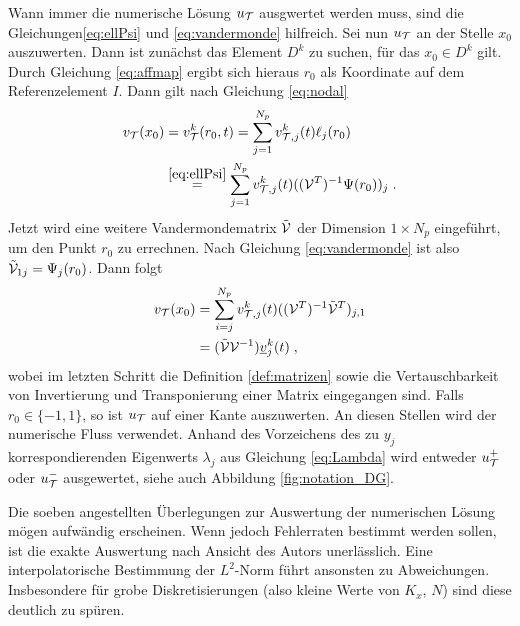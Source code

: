 Wann immer die numerische Lösung $u_{\mathcal{T}}$ ausgwertet werden muss, sind die Gleichungen\eqref{eq:ellPsi} und \eqref{eq:vandermonde} hilfreich. Sei nun $u_{\mathcal{T}}$ an der Stelle $x_0$ auszuwerten. Dann ist zunächst das Element $D^k$ zu suchen, für das $x_0\in D^k$ gilt. Durch Gleichung \eqref{eq:affmap} ergibt sich hieraus $r_0$ als Koordinate auf dem Referenzelement $I$. Dann gilt nach Gleichung \eqref{eq:nodal}
\begin{align*}
  v_{\mathcal{T}}(x_0) &= v_{\mathcal{T}}^k(r_0,t) = \sum_{j=1}^{N_p} v_{\mathcal{T},j}^k(t)\ell_j(r_0) \\
   &\stackrel{\eqref{eq:ellPsi}}{=} \sum_{j=1}^{N_p} v_{\mathcal{T},j}^k(t) ((\mathcal{V}^T)^{-1}\Psi(r_0))_j \; .
\end{align*}
Jetzt wird eine weitere Vandermondematrix $\tilde{\mathcal{V}}$ der Dimension $1\times N_p$ eingeführt, um den Punkt $r_0$ zu errechnen. Nach Gleichung \eqref{eq:vandermonde} ist also $\tilde{\mathcal{V}}_{1j}=\Psi_j(r_0)$. Dann folgt
\begin{align*}
  v_{\mathcal{T}}(x_0) &= \sum_{i=j}^{N_p} v_{\mathcal{T},j}^k(t) ((\mathcal{V}^T)^{-1}\tilde{\mathcal{V}}^T)_{j,1} \\
  &= (\tilde{\mathcal{V}}\mathcal{V}^{-1})\underline{v}_j^k(t) \; ,
\end{align*}
wobei im letzten Schritt die Definition \ref{def:matrizen} sowie die Vertauschbarkeit von Invertierung und Transponierung einer Matrix eingegangen sind. Falls $r_0\in\{-1,1\}$, so ist $u_{\mathcal{T}}$ auf einer Kante auszuwerten. An diesen Stellen wird der numerische Fluss verwendet. Anhand des Vorzeichens des zu $y_j$ korrespondierenden Eigenwerts $\lambda_j$ aus Gleichung \eqref{eq:Lambda} wird entweder $u_{\mathcal{T}}^+$ oder $u_{\mathcal{T}}^-$ ausgewertet, siehe auch Abbildung \ref{fig:notation_DG}.

Die soeben angestellten Überlegungen zur Auswertung der numerischen Lösung mögen aufwändig erscheinen. Wenn jedoch Fehlerraten bestimmt werden sollen, ist die exakte Auswertung nach Ansicht des Autors unerlässlich. Eine interpolatorische Bestimmung der $L^2$-Norm führt ansonsten zu Abweichungen. Insbesondere für grobe Diskretisierungen (also kleine Werte von $K_x$, $N$) sind diese deutlich zu spüren.


